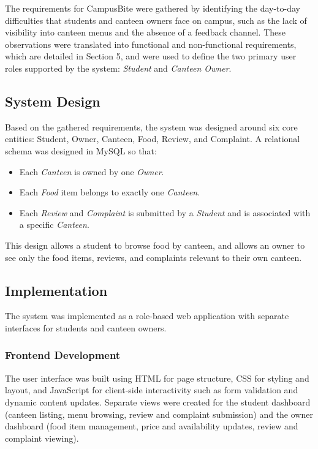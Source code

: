 \documentclass[ 12pt,a4paper,twocolumn,fleqn]{article}
\begin{document}
The requirements for CampusBite were gathered by identifying the day-to-day difficulties that students and canteen owners face on campus, such as the lack of visibility into canteen menus and the absence of a feedback channel. These observations were translated into functional and non-functional requirements, which are detailed in Section 5, and were used to define the two primary user roles supported by the system: \textit{Student} and \textit{Canteen Owner}.

\subsection{System Design}

Based on the gathered requirements, the system was designed around six core entities: Student, Owner, Canteen, Food, Review, and Complaint. A relational schema was designed in MySQL so that:
\begin{itemize}
    \item Each \textit{Canteen} is owned by one \textit{Owner}.
    \item Each \textit{Food} item belongs to exactly one \textit{Canteen}.
    \item Each \textit{Review} and \textit{Complaint} is submitted by a \textit{Student} and is associated with a specific \textit{Canteen}.
\end{itemize}
This design allows a student to browse food by canteen, and allows an owner to see only the food items, reviews, and complaints relevant to their own canteen.

\subsection{Implementation}

The system was implemented as a role-based web application with separate interfaces for students and canteen owners.

\subsubsection{Frontend Development}
The user interface was built using HTML for page structure, CSS for styling and layout, and JavaScript for client-side interactivity such as form validation and dynamic content updates. Separate views were created for the student dashboard (canteen listing, menu browsing, review and complaint submission) and the owner dashboard (food item management, price and availability updates, review and complaint viewing).
\end{document}
